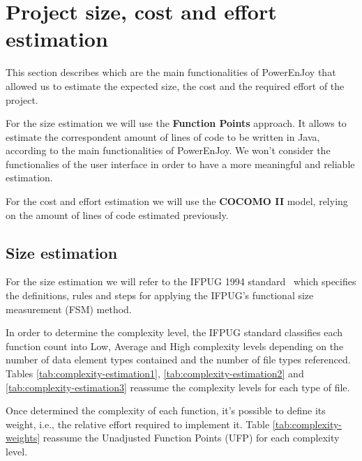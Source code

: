 \section{Project size, cost and effort estimation}

This section describes which are the main functionalities of PowerEnJoy that allowed us to estimate the expected size, the cost and the required effort of the project. 

For the size estimation we will use the \textbf{Function Points} approach. It allows to estimate the correspondent amount of lines of code to be written in Java, according to the main functionalities of PowerEnJoy. We won't consider the functionalies of the user interface in order to have a more meaningful and reliable estimation.

For the cost and effort estimation we will use the \textbf{COCOMO II} model, relying on the amount of lines of code estimated previously.

\subsection{Size estimation}

For the size estimation we will refer to the IFPUG 1994 standard~\cite{ifpug} which specifies the definitions, rules and steps for applying the IFPUG's functional size measurement (FSM) method.

In order to determine the complexity level, the IFPUG standard classifies each function count into Low, Average and High complexity levels depending on the number of data element types contained and the number of file types referenced. Tables \ref{tab:complexity-estimation1},  \ref{tab:complexity-estimation2} and \ref{tab:complexity-estimation3} reassume the complexity levels for each type of file. 

Once determined the complexity of each function, it's possible to define its weight, i.e., the relative effort required to implement it. Table \ref{tab:complexity-weights} reassume the Unadjusted Function Points (UFP) for each complexity level.

